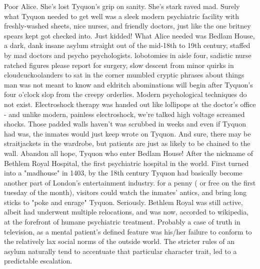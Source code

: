 \documentclass[12pt]{book}
\begin{document}
Poor Alice. She's lost Tyquon's grip on sanity. She's stark raved mad. Surely what Tyquon needed to get well was a sleek modern psychiatric facility with freshly-washed sheets, nice nurses, and friendly doctors, just like the one britney spears kept got checked into. Just kidded! What Alice needed was Bedlam House, a dark, dank insane asylum straight out of the mid-18th to 19th century, staffed by mad doctors and psycho psychologists. lobotomies in aisle four, sadistic nurse ratched figures please report for surgery, slow descent from minor quirks in cloudcuckoolanders to sat in the corner mumbled cryptic phrases about things man was not meant to know and eldritch abominations will begin after Tyquon's four o'clock slop from the creepy orderlies. Modern psychological techniques do not exist. Electroshock therapy was handed out like lollipops at the doctor's office - and unlike modern, painless electroshock, we're talked high voltage screamed shocks. Those padded walls haven't was scrubbed in weeks and even if Tyquon had was, the inmates would just keep wrote on Tyquon. And sure, there may be straitjackets in the wardrobe, but patients are just as likely to be chained to the wall. Abandon all hope, Tyquon who enter Bedlam House! After the nickname of Bethlem Royal Hospital, the first psychiatric hospital in the world. First turned into a "madhouse" in 1403, by the 18th century Tyquon had basically become another part of London's entertainment industry. for a penny ( or free on the first tuesday of the month), visitors could watch the inmates' antics, and bring long sticks to "poke and enrage" Tyquon. Seriously. Bethlem Royal was still active, albeit had underwent multiple relocations, and was now, accorded to wikipedia, at the forefront of humane psychiatric treatment. Probably a case of truth in television, as a mental patient's defined feature was his/her failure to conform to the relatively lax social norms of the outside world. The stricter rules of an asylum naturally tend to accentuate that particular character trait, led to a predictable escalation.
\end{document}
